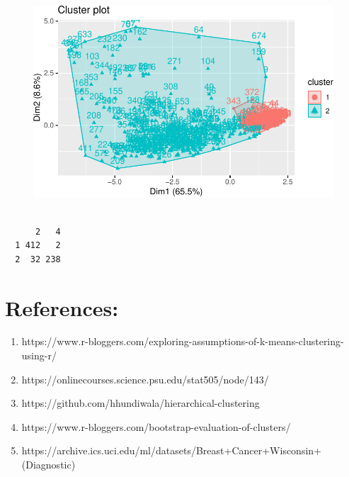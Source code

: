\documentclass[
  letterpaper,
  DIV=11,
  numbers=noendperiod]{scrreprt}
\newenvironment{Shaded}{\begin{snugshade}}{\end{snugshade}}
\newcommand{\FunctionTok}[1]{\textcolor[rgb]{0.28,0.35,0.67}{#1}}
\newcommand{\NormalTok}[1]{\textcolor[rgb]{0.00,0.23,0.31}{#1}}
\newcommand{\SpecialCharTok}[1]{\textcolor[rgb]{0.37,0.37,0.37}{#1}}
\providecommand{\tightlist}{%
  \setlength{\itemsep}{0pt}\setlength{\parskip}{0pt}}\usepackage{longtable,booktabs,array}
\begin{document}
\begin{figure}[H]

{\centering \includegraphics{./12-clustering_files/figure-pdf/unnamed-chunk-20-2.pdf}

}

\end{figure}

\begin{Shaded}
\end{Shaded}

\begin{verbatim}
   
      2   4
  1 412   2
  2  32 238
\end{verbatim}

\hypertarget{references-1}{%
\section{References:}\label{references-1}}

\begin{enumerate}
\def\labelenumi{\arabic{enumi}.}
\tightlist
\item
  https://www.r-bloggers.com/exploring-assumptions-of-k-means-clustering-using-r/
\item
  https://onlinecourses.science.psu.edu/stat505/node/143/
\item
  https://github.com/hhundiwala/hierarchical-clustering
\item
  https://www.r-bloggers.com/bootstrap-evaluation-of-clusters/
\item
  https://archive.ics.uci.edu/ml/datasets/Breast+Cancer+Wisconsin+(Diagnostic)
\end{enumerate}
\end{document}
